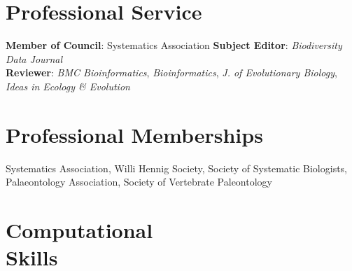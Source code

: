 \documentclass[margin,line]{resume}
\begin{document}
\begin{resume}
\vspace{-7 mm}  

    \section{\mysidestyle Professional Service} 

\textbf{Member of Council}: Systematics Association \hspace{10mm} \textbf{Subject Editor}: \textsl{Biodiversity Data Journal} \\
\textbf{Reviewer}: \textsl{BMC Bioinformatics}, \textsl{Bioinformatics}, \textsl{J. of Evolutionary Biology}, \textsl{Ideas in Ecology \& Evolution}\\

\vspace{-7 mm} 
    \section{\mysidestyle Professional Memberships}

Systematics Association, Willi Hennig Society, Society of Systematic Biologists, \\
Palaeontology Association, Society of Vertebrate Paleontology\\

\vspace{-7 mm}  
    \section{\mysidestyle Computational \\ Skills} 


\end{resume}
\end{document}
